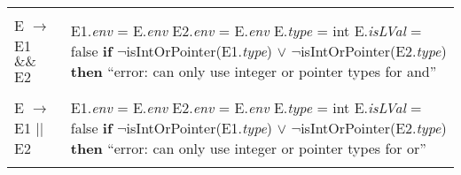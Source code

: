 \documentclass{article}
\begin{document}
\begin{center}
\begin{longtable}{ |l|l| }
     & \\
    
    E $\rightarrow$ E1 $\&\&$ E2 & \makecell[l]{E1.\textit{env} = E.\textit{env} \\ E2.\textit{env} = E.\textit{env} \\ E.\textit{type} = int \\ E.\textit{isLVal} = false \\ \textbf{if} $\neg$isIntOrPointer(E1.\textit{type}) $\lor$ $\neg$isIntOrPointer(E2.\textit{type}) \\ \textbf{then} ``error: can only use integer or pointer types for and''} \\ 
    
     & \\
    
    E $\rightarrow$ E1 $||$ E2 & \makecell[l]{E1.\textit{env} = E.\textit{env} \\ E2.\textit{env} = E.\textit{env} \\ E.\textit{type} = int \\ E.\textit{isLVal} = false \\ \textbf{if} $\neg$isIntOrPointer(E1.\textit{type}) $\lor$ $\neg$isIntOrPointer(E2.\textit{type}) \\ \textbf{then} ``error: can only use integer or pointer types for or''} \\
    
     & \\
    
    \hline
\end{longtable}
\end{center}
\end{document}
